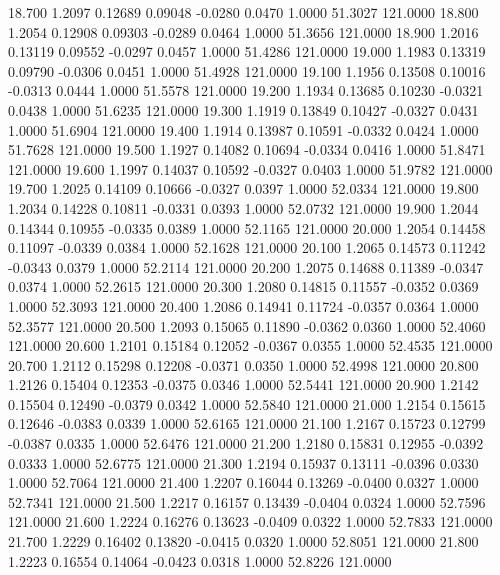   18.700   1.2097   0.12689   0.09048  -0.0280   0.0470   1.0000  51.3027 121.0000
  18.800   1.2054   0.12908   0.09303  -0.0289   0.0464   1.0000  51.3656 121.0000
  18.900   1.2016   0.13119   0.09552  -0.0297   0.0457   1.0000  51.4286 121.0000
  19.000   1.1983   0.13319   0.09790  -0.0306   0.0451   1.0000  51.4928 121.0000
  19.100   1.1956   0.13508   0.10016  -0.0313   0.0444   1.0000  51.5578 121.0000
  19.200   1.1934   0.13685   0.10230  -0.0321   0.0438   1.0000  51.6235 121.0000
  19.300   1.1919   0.13849   0.10427  -0.0327   0.0431   1.0000  51.6904 121.0000
  19.400   1.1914   0.13987   0.10591  -0.0332   0.0424   1.0000  51.7628 121.0000
  19.500   1.1927   0.14082   0.10694  -0.0334   0.0416   1.0000  51.8471 121.0000
  19.600   1.1997   0.14037   0.10592  -0.0327   0.0403   1.0000  51.9782 121.0000
  19.700   1.2025   0.14109   0.10666  -0.0327   0.0397   1.0000  52.0334 121.0000
  19.800   1.2034   0.14228   0.10811  -0.0331   0.0393   1.0000  52.0732 121.0000
  19.900   1.2044   0.14344   0.10955  -0.0335   0.0389   1.0000  52.1165 121.0000
  20.000   1.2054   0.14458   0.11097  -0.0339   0.0384   1.0000  52.1628 121.0000
  20.100   1.2065   0.14573   0.11242  -0.0343   0.0379   1.0000  52.2114 121.0000
  20.200   1.2075   0.14688   0.11389  -0.0347   0.0374   1.0000  52.2615 121.0000
  20.300   1.2080   0.14815   0.11557  -0.0352   0.0369   1.0000  52.3093 121.0000
  20.400   1.2086   0.14941   0.11724  -0.0357   0.0364   1.0000  52.3577 121.0000
  20.500   1.2093   0.15065   0.11890  -0.0362   0.0360   1.0000  52.4060 121.0000
  20.600   1.2101   0.15184   0.12052  -0.0367   0.0355   1.0000  52.4535 121.0000
  20.700   1.2112   0.15298   0.12208  -0.0371   0.0350   1.0000  52.4998 121.0000
  20.800   1.2126   0.15404   0.12353  -0.0375   0.0346   1.0000  52.5441 121.0000
  20.900   1.2142   0.15504   0.12490  -0.0379   0.0342   1.0000  52.5840 121.0000
  21.000   1.2154   0.15615   0.12646  -0.0383   0.0339   1.0000  52.6165 121.0000
  21.100   1.2167   0.15723   0.12799  -0.0387   0.0335   1.0000  52.6476 121.0000
  21.200   1.2180   0.15831   0.12955  -0.0392   0.0333   1.0000  52.6775 121.0000
  21.300   1.2194   0.15937   0.13111  -0.0396   0.0330   1.0000  52.7064 121.0000
  21.400   1.2207   0.16044   0.13269  -0.0400   0.0327   1.0000  52.7341 121.0000
  21.500   1.2217   0.16157   0.13439  -0.0404   0.0324   1.0000  52.7596 121.0000
  21.600   1.2224   0.16276   0.13623  -0.0409   0.0322   1.0000  52.7833 121.0000
  21.700   1.2229   0.16402   0.13820  -0.0415   0.0320   1.0000  52.8051 121.0000
  21.800   1.2223   0.16554   0.14064  -0.0423   0.0318   1.0000  52.8226 121.0000
